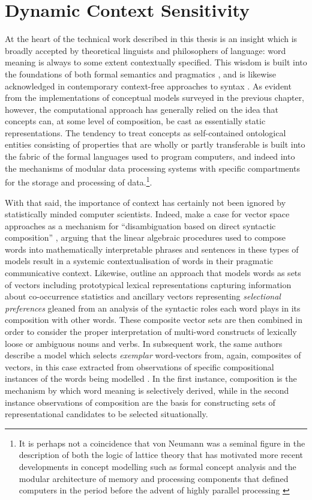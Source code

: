 \section{Dynamic Context Sensitivity}
At the heart of the technical work described in this thesis is an insight which is broadly accepted by theoretical linguists and philosophers of language: word meaning is always to some extent contextually specified.  This wisdom is built into the foundations of both formal semantics \citep{Montague1974} and pragmatics \citep{Grice1975}, and is likewise acknowledged in contemporary context-free approaches to syntax \citep{Chomsky1986}.  As evident from the implementations of conceptual models surveyed in the previous chapter, however, the computational approach has generally relied on the idea that concepts can, at some level of composition, be cast as essentially static representations.  The tendency to treat concepts as self-contained ontological entities consisting of properties that are wholly or partly transferable is built into the fabric of the formal languages used to program computers, and indeed into the mechanisms of modular data processing systems with specific compartments for the storage and processing of data.\footnote{It is perhaps not a coincidence that von Neumann was a seminal figure in the description of both the logic of lattice theory \citep{Birkhoff1958} that has motivated more recent developments in concept modelling such as formal concept analysis \citep{Wille1982} and the modular architecture of memory and processing components that defined computers in the period before the advent of highly parallel processing \citep{VonNeumann1945}}.

With that said, the importance of context has certainly not been ignored by statistically minded computer scientists.  Indeed, \citeauthor{BaroniEA2014b} make a case for vector space approaches as a mechanism for ``disambiguation based on direct syntactic composition'' \citep[][p. 254]{BaroniEA2014b}, arguing that the linear algebraic procedures used to compose words into mathematically interpretable phrases and sentences in these types of models result in a systemic contextualisation of words in their pragmatic communicative context.  Likewise, \cite{ErkEA2008} outline an approach that models words as sets of vectors including prototypical lexical representations capturing information about co-occurrence statistics and ancillary vectors representing \emph{selectional preferences} \citep[\emph{per}][]{Wilks1978} gleaned from an analysis of the syntactic roles each word plays in its composition with other words.  These composite vector sets are then combined in order to consider the proper interpretation of multi-word constructs of lexically loose or ambiguous nouns and verbs.  In subsequent work, the same authors describe a model which selects \emph{exemplar} word-vectors from, again, composites of vectors, in this case extracted from observations of specific compositional instances of the words being modelled \citep{ErkEA2010}.  In the first instance, composition is the mechanism by which word meaning is selectively derived, while in the second instance observations of composition are the basis for constructing sets of representational candidates to be selected situationally.

